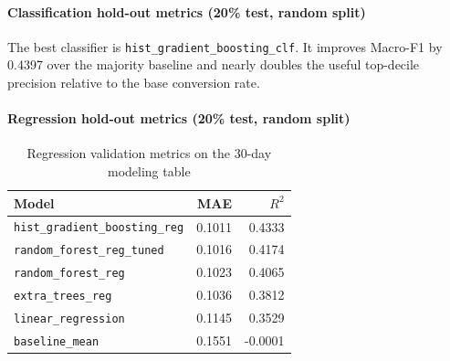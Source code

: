 \paragraph{Classification hold-out metrics (20\% test, random split)}
\begin{table}[H]
\centering
{}
\caption{Classification validation metrics on the 30-day modeling table}
\label{tab:modeling_classification_metrics}
\end{table}

The best classifier is \texttt{hist\_gradient\_boosting\_clf}. It improves Macro-F1 by 0.4397 over the majority baseline and nearly doubles the useful top-decile precision relative to the base conversion rate.

\paragraph{Regression hold-out metrics (20\% test, random split)}
\begin{table}[H]
\centering
\begin{tabular}{lrr}
\hline
Model & MAE & $R^2$ \\
\hline
\texttt{hist\_gradient\_boosting\_reg} & 0.1011 & 0.4333 \\
\texttt{random\_forest\_reg\_tuned} & 0.1016 & 0.4174 \\
\texttt{random\_forest\_reg} & 0.1023 & 0.4065 \\
\texttt{extra\_trees\_reg} & 0.1036 & 0.3812 \\
\texttt{linear\_regression} & 0.1145 & 0.3529 \\
\texttt{baseline\_mean} & 0.1551 & -0.0001 \\
\hline
\end{tabular}
\caption{Regression validation metrics on the 30-day modeling table}
\label{tab:modeling_regression_metrics}
\end{table}

